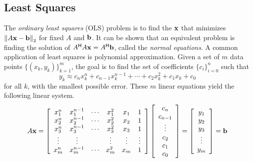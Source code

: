 \subsection*{Least Squares} %

The \emph{ordinary least squares} (OLS) problem is to find the $\mathbf{x}$ that minimizes $\left\lVert A\mathbf{x} -\mathbf{b}\right\rVert_2$ for fixed $A$ and $\mathbf{b}$.
It can be shown that an equivalent problem is finding the solution of $A^{\mathsf H} A\mathbf{x} =A^{\mathsf H} \mathbf{b}$, called the \emph{normal equations}.
%
A common application of least squares is polynomial approximation.
Given a set of $m$ data points $\{(x_k, y_k)\}_{k=1}^m$, the goal is to find the set of coefficients $\{c_i\}_{i=0}^n$ such that
\[
y_k \approx c_n x_k^n + c_{n-1} x_k^{n-1} + \cdots + c_2 x_k^2 + c_1 x_k + c_0
\]
for all $k$, with the smallest possible error.
These $m$ linear equations yield the following linear system.
\begin{equation}
A\mathbf{x} =
\left[\begin{array}{cccccc}
x_1^n & x_1^{n-1} & \cdots & x_1^2 & x_1 & 1 \\
x_2^n & x_2^{n-1} & \cdots & x_2^2 & x_2 & 1 \\
x_3^n & x_3^{n-1} & \cdots & x_3^2 & x_3 & 1 \\
\vdots & \vdots & & \vdots & \vdots & \vdots \\
x_m^n & x_m^{n-1} & \cdots & x_m^2 & x_m & 1 \\
\end{array}\right]
\left[\begin{array}{c}
c_n \\ c_{n-1} \\ \vdots \\ c_2 \\ c_1 \\ c_0
\end{array}\right]
=
\left[\begin{array}{c} y_1 \\ y_2 \\ y_3 \\ \vdots \\ y_m \end{array}\right]
= \mathbf{b}
\label{eq:polynomial-least-squares}
\end{equation}

